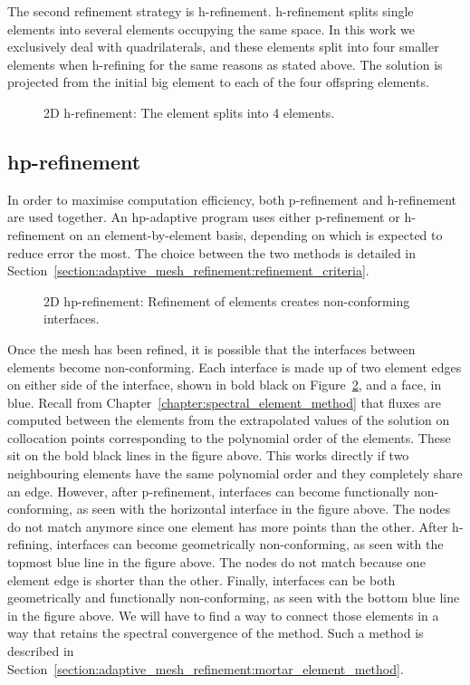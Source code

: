 The second refinement strategy is h-refinement\@. h-refinement splits single elements into several
elements occupying the same space. In this work we exclusively deal with quadrilaterals, and these
elements split into four smaller elements when h-refining for the same reasons as stated above. The
solution is projected from the initial big element to each of the four offspring elements.

\begin{figure}[H]
	\centering
	
	\caption{2D h-refinement: The element splits into 4 elements.}\label{fig:h-refinement}
\end{figure}

\subsection{hp-refinement}\label{subsection:adaptive_mesh_refinement:refinement_strategies:hp-refinement}

In order to maximise computation efficiency, both p-refinement and h-refinement are used together.
An hp-adaptive program uses either p-refinement or h-refinement on an element-by-element basis,
depending on which is expected to reduce error the most. The choice between the two methods is
detailed in Section~\ref{section:adaptive_mesh_refinement:refinement_criteria}.

\begin{figure}[H]
	\centering
	
	\caption{2D hp-refinement: Refinement of elements creates non-conforming interfaces.}\label{fig:hp-refinement}
\end{figure}

Once the mesh has been refined, it is possible that the interfaces between elements become
non-conforming. Each interface is made up of two element edges on either side of the interface,
shown in bold black on Figure~\ref{fig:hp-refinement}, and a face, in blue. Recall from
Chapter~\ref{chapter:spectral_element_method} that fluxes are computed between the elements from the
extrapolated values of the solution on collocation points corresponding to the polynomial order of
the elements. These sit on the bold black lines in the figure above. This works directly if two
neighbouring elements have the same polynomial order and they completely share an edge. However,
after p-refinement, interfaces can become functionally non-conforming, as seen with the horizontal
interface in the figure above. The nodes do not match anymore since one element has more points than
the other. After h-refining, interfaces can become geometrically non-conforming, as seen with the
topmost blue line in the figure above. The nodes do not match because one element edge is shorter
than the other. Finally, interfaces can be both geometrically and functionally non-conforming, as
seen with the bottom blue line in the figure above. We will have to find a way to connect those
elements in a way that retains the spectral convergence of the method. Such a method is described in
Section~\ref{section:adaptive_mesh_refinement:mortar_element_method}.

